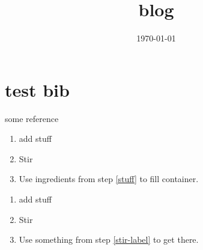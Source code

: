 \documentclass[aps,prb,citeautoscript,preprint,citeautoscript,showkeys]{revtex4-1}
\date{\today}
\title{blog}
\begin{document}
\section{test bib}
\label{sec-1}

some reference \cite{armiento-2014-high}




\begin{enumerate}
\item add stuff \label{stuff}
\item Stir
\item Use ingredients from step \ref{stuff} to fill container.
\end{enumerate}


\begin{enumerate}
\item add stuff
\item Stir \label{stir-label}
\item Use something from step \ref{stir-label} to get there.
\end{enumerate}
\end{document}
